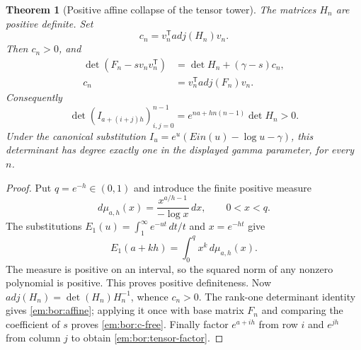 \documentclass[11pt,a4paper]{article}
\newtheorem{theorem}{Theorem}[section]
\theoremstyle{definition}
\theoremstyle{remark}
\theoremstyle{plain}
\numberwithin{equation}{section}
\def\operatorname#1{#1}\def\mathrm#1{#1}}
\begin{document}
\begin{theorem}[Positive affine collapse of the tensor tower]
\label{em:bor:positive-affine}
The matrices $H_n$ are positive definite.  Set
\[
 c_n=v_n^{\mathsf T}\operatorname{adj}(H_n)v_n.
\]
Then $c_n>0$, and
\begin{align}
 \det(F_n-sv_nv_n^{\mathsf T})
   &=\det H_n+(\gamma-s)c_n,\label{em:bor:affine}\\
 c_n&=v_n^{\mathsf T}\operatorname{adj}(F_n)v_n.\label{em:bor:c-free}
\end{align}
Consequently
\begin{equation}\label{em:bor:tensor-factor}
 \det(I_{a+(i+j)h})_{i,j=0}^{n-1}
   =e^{na+hn(n-1)}\det H_n>0.
\end{equation}
Under the canonical substitution
$I_u=e^u(\operatorname{Ein}(u)-\log u-\gamma)$, this determinant
has degree exactly one in the displayed gamma parameter, for every $n$.
\end{theorem}
\begin{proof}
Put $q=e^{-h}\in(0,1)$ and introduce the finite positive measure
\[
 d\mu_{a,h}(x)=\frac{x^{a/h-1}}{-\log x}\,dx,
 \qquad 0<x<q.
\]
The substitutions $E_1(u)=\int_1^\infty e^{-ut}\,dt/t$ and
$x=e^{-ht}$ give
\[
 E_1(a+kh)=\int_0^q x^k\,d\mu_{a,h}(x).
\]
The measure is positive on an interval, so the squared norm of any
nonzero polynomial is positive.  This proves positive definiteness.
Now $\operatorname{adj}(H_n)=\det(H_n)H_n^{-1}$, whence $c_n>0$.
The rank-one determinant identity gives \eqref{em:bor:affine}; applying it
once with base matrix $F_n$ and comparing the coefficient of $s$ proves
\eqref{em:bor:c-free}.  Finally factor $e^{a+ih}$ from row $i$ and
$e^{jh}$ from column $j$ to obtain \eqref{em:bor:tensor-factor}.
\end{proof}
\end{document}
